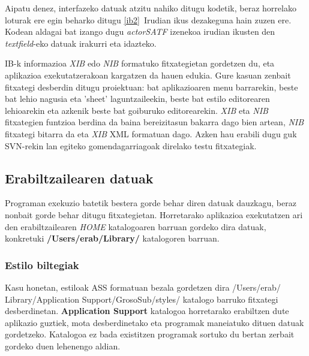 Aipatu denez, interfazeko datuak atzitu nahiko ditugu kodetik, beraz horrelako loturak ere egin beharko ditugu \ref{ib2}~Irudian ikus dezakeguna hain zuzen ere. Kodean aldagai bat izango dugu \textit{actorSATF} izenekoa irudian ikusten den \textit{textfield}-eko datuak irakurri eta idazteko.

IB-k informazioa \textit{XIB} edo \textit{NIB} formatuko fitxategietan gordetzen du, eta aplikazioa exekutatzerakoan kargatzen da hauen edukia. Gure kasuan zenbait fitxategi desberdin ditugu proiektuan: bat aplikazioaren menu barrarekin, beste bat lehio nagusia eta 'sheet' laguntzaileekin, beste bat estilo editorearen lehioarekin eta azkenik beste bat goiburuko editorearekin. \textit{XIB} eta \textit{NIB} fitxategien funtzioa berdina da baina bereizitasun bakarra dago bien artean, \textit{NIB} fitxategi bitarra da eta \textit{XIB} XML formatuan dago. Azken hau erabili dugu guk SVN-rekin lan egiteko gomendagarriagoak direlako testu fitxategiak.

\subsection{Erabiltzailearen datuak}
Programan exekuzio batetik bestera gorde behar diren datuak dauzkagu, beraz nonbait gorde behar ditugu fitxategietan. Horretarako aplikazioa exekutatzen ari den erabiltzailearen \textit{HOME} katalogoaren barruan gordeko dira datuak, konkretuki \textbf{/Users/erab/Library/} katalogoren barruan.

\subsubsection{Estilo biltegiak}
Kasu honetan, estiloak ASS formatuan bezala gordetzen dira /Users/erab/ Library/Application Support/GrosoSub/styles/ katalogo barruko fitxategi desberdinetan. \textbf{Application Support} katalogoa horretarako erabiltzen dute aplikazio guztiek, mota desberdinetako eta programak maneiatuko dituen datuak gordetzeko. Katalogoa ez bada existitzen programak sortuko du bertan zerbait gordeko duen lehenengo aldian.

